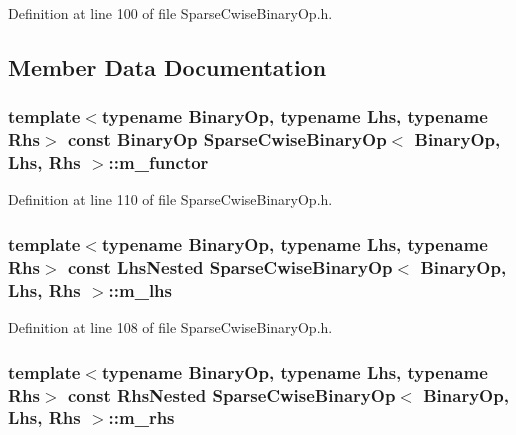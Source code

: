 Definition at line 100 of file Sparse\-Cwise\-Binary\-Op.\-h.



\subsection{Member Data Documentation}
\hypertarget{class_sparse_cwise_binary_op_a59fe533596b38cad5bbd2ea9a687c208}{
\subsubsection[{m\-\_\-functor}]{\setlength{\rightskip}{0pt plus 5cm}template$<$typename Binary\-Op, typename Lhs, typename Rhs$>$ const Binary\-Op {\bf Sparse\-Cwise\-Binary\-Op}$<$ Binary\-Op, Lhs, Rhs $>$\-::m\-\_\-functor\hspace{0.3cm}{\ttfamily [protected]}}}\label{class_sparse_cwise_binary_op_a59fe533596b38cad5bbd2ea9a687c208}


Definition at line 110 of file Sparse\-Cwise\-Binary\-Op.\-h.

\hypertarget{class_sparse_cwise_binary_op_aad7278598734eddba46db178982a448a}{
\subsubsection[{m\-\_\-lhs}]{\setlength{\rightskip}{0pt plus 5cm}template$<$typename Binary\-Op, typename Lhs, typename Rhs$>$ const Lhs\-Nested {\bf Sparse\-Cwise\-Binary\-Op}$<$ Binary\-Op, Lhs, Rhs $>$\-::m\-\_\-lhs\hspace{0.3cm}{\ttfamily [protected]}}}\label{class_sparse_cwise_binary_op_aad7278598734eddba46db178982a448a}


Definition at line 108 of file Sparse\-Cwise\-Binary\-Op.\-h.

\hypertarget{class_sparse_cwise_binary_op_ae9ed72be62625a1d5f27e7db2252b5f3}{
\subsubsection[{m\-\_\-rhs}]{\setlength{\rightskip}{0pt plus 5cm}template$<$typename Binary\-Op, typename Lhs, typename Rhs$>$ const {\bf Rhs\-Nested} {\bf Sparse\-Cwise\-Binary\-Op}$<$ Binary\-Op, Lhs, Rhs $>$\-::m\-\_\-rhs\hspace{0.3cm}{\ttfamily [protected]}}}\label{class_sparse_cwise_binary_op_ae9ed72be62625a1d5f27e7db2252b5f3}


